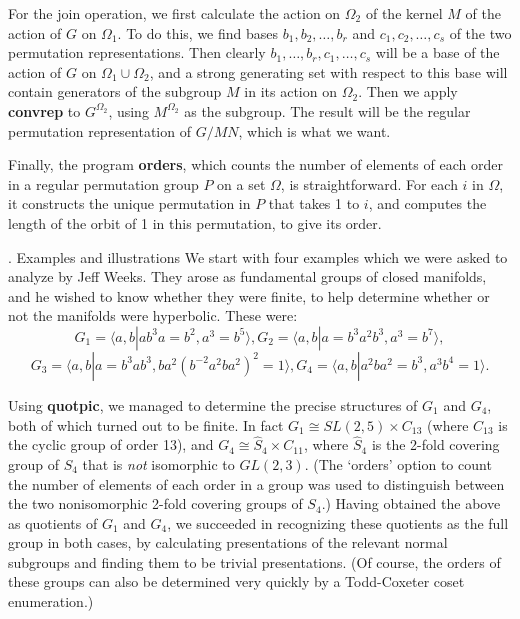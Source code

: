 For the join
operation, we first calculate the action on $\Omega_2$ of the kernel $M$
of the action of $G$ on $\Omega_1$. To do this, we find bases
$b_1, b_2, \ldots ,b_r$ and $c_1,c_2, \ldots, c_s$ of the two permutation
representations. Then clearly $b_1, \ldots ,b_r, c_1, \ldots, c_s$
will be a base of the action of $G$ on $\Omega_1 \cup \Omega_2$, and a strong
generating set with respect to this base will contain generators of the
subgroup $M$ in its action on $\Omega_2$. Then we apply {\bf convrep} to
$G^{\Omega_2}$, using $M^{\Omega_2}$ as the subgroup.
The result will be the regular permutation representation of $G/MN$, which
is what we want.

Finally, the program {\bf orders}, which counts the number of elements
of each order in a regular permutation group $P$ on a set $\Omega$, is
straightforward. For each $i$ in $\Omega$, it
constructs the unique permutation in $P$ that takes  1  to $i$,  and computes
the length of the orbit of  1  in this permutation, to give its order.

. Examples and illustrations                %
\endhead                             %
We start with four examples which we were asked to analyze by Jeff Weeks.
They arose as fundamental groups of closed manifolds, and he wished to know
whether they were finite, to help determine whether or not the manifolds
were hyperbolic.
These were:
$$  G_1 = \langle a,b | ab^3a=b^2, a^3=b^5 \rangle,
 G_2 = \langle a,b | a=b^3a^2b^3, a^3=b^7 \rangle,$$
$$  G_3 = \langle a,b | a=b^3ab^3, ba^2(b^{-2}a^2ba^2)^2=1 \rangle,
G_4 = \langle a,b | a^2ba^2=b^3, a^3b^4=1 \rangle.$$

Using {\bf quotpic}, we managed to
determine the precise structures of $G_1$ and $G_4$,
both of which turned out to be finite. In fact $G_1 \cong
SL(2,5) \times C_{13}$ (where  $C_{13}$ is the cyclic group of order 13),
and $G_4 \cong \hat{S}_4 \times C_{11}$, where
$\hat{S}_4$ is the 2-fold covering group of $S_4$ that is {\it not}
isomorphic to $GL(2,3)$. (The `orders' option to count the number of
elements of each order in a group was used to distinguish between the
two nonisomorphic 2-fold covering groups of $S_4$.) Having obtained
the above as quotients of $G_1$ and $G_4$, we succeeded in recognizing
these quotients as the full group in both cases, by calculating
presentations of the relevant normal subgroups and finding them to be
trivial presentations. (Of course, the orders of these groups can also
be determined very quickly by a Todd-Coxeter coset enumeration.) 

